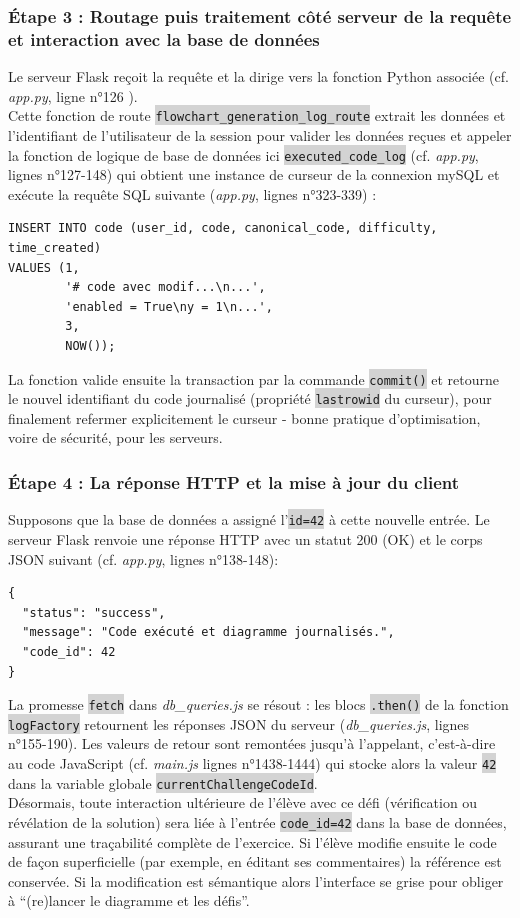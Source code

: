 \documentclass[11pt,a4paper]{article}
\newcommand{\code}[1]{\colorbox{lightgray}{\texttt{\small #1}}}
\newcommand{\filepath}[1]{\textit{#1}}
\begin{document}
\subsubsection*{Étape 3 : Routage puis traitement côté serveur de la requête et interaction avec la base de données}
Le serveur Flask reçoit la requête et la dirige vers la fonction Python associée (cf. \filepath{app.py}, ligne n°126 ). \\ 
Cette fonction de route \code{flowchart\_generation\_log\_route} extrait les données et l'identifiant de l'utilisateur de la session pour valider les données reçues et appeler la fonction de logique de base de données ici \code{executed\_code\_log} (cf. \filepath{app.py}, lignes n°127-148) qui obtient une instance de curseur de la connexion mySQL et exécute la requête SQL suivante (\filepath{app.py}, lignes n°323-339) :
\begin{verbatim}
INSERT INTO code (user_id, code, canonical_code, difficulty, time_created) 
VALUES (1, 
        '# code avec modif...\n...', 
        'enabled = True\ny = 1\n...', 
        3, 
        NOW());
\end{verbatim}

La fonction valide ensuite la transaction par la commande \code{commit()} et retourne le nouvel identifiant du code journalisé (propriété \code{lastrowid} du curseur), pour finalement refermer explicitement le curseur - bonne pratique d'optimisation, voire de sécurité, pour les serveurs.

\subsubsection*{Étape 4 : La réponse HTTP et la mise à jour du client}
Supposons que la base de données a assigné l'\code{id=42} à cette nouvelle entrée. Le serveur Flask renvoie une réponse HTTP avec un statut 200 (OK) et le corps JSON suivant (cf. \filepath{app.py}, lignes n°138-148):
\begin{verbatim}
{
  "status": "success",
  "message": "Code exécuté et diagramme journalisés.",
  "code_id": 42
}
\end{verbatim}
 La promesse \code{fetch} dans \filepath{db\_queries.js} se résout : les blocs \code{.then()} de la fonction \code{logFactory} retournent les réponses JSON du serveur (\filepath{db\_queries.js}, lignes n°155-190). Les valeurs de retour sont remontées jusqu'à l'appelant, c'est-à-dire au code JavaScript (cf. \filepath{main.js} lignes n°1438-1444) qui stocke alors la valeur \code{42} dans la variable globale \code{currentChallengeCodeId}.\\
 Désormais, toute interaction ultérieure de l'élève avec ce défi (vérification ou révélation de la solution) sera liée à l'entrée \code{code\_id=42} dans la base de données, assurant une traçabilité complète de l'exercice. Si l'élève modifie ensuite le code de façon superficielle (par exemple, en éditant ses commentaires) la référence est conservée. Si la modification est sémantique alors l'interface se grise pour obliger à ``(re)lancer le diagramme et les défis''. 
\end{document}
